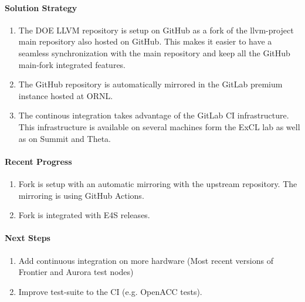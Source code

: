 \paragraph{Solution Strategy}

\begin{enumerate}

\item The DOE LLVM repository is setup on GitHub as a fork of the llvm-project
      main repository also hosted on GitHub. This makes it easier to have a
      seamless synchronization with the main repository and keep all the
      GitHub main-fork integrated features.

\item The GitHub repository is automatically mirrored in the GitLab premium
      instance hosted at ORNL.

\item The continous integration takes advantage of the GitLab CI infrastructure.
      This infrastructure is available on several machines form the ExCL lab as
      well as on Summit and Theta.

\end{enumerate}


\paragraph{Recent Progress}

\begin{enumerate}
\item Fork is setup with an automatic mirroring with the upstream repository.
      The mirroring is using GitHub Actions.

\item Fork is integrated with E4S releases.
\end{enumerate}


\paragraph{Next Steps}

\begin{enumerate}
\item Add continuous integration on more hardware (Most recent versions of Frontier and Aurora test nodes)
\item Improve test-suite to the CI (e.g. OpenACC tests).
\end{enumerate}
